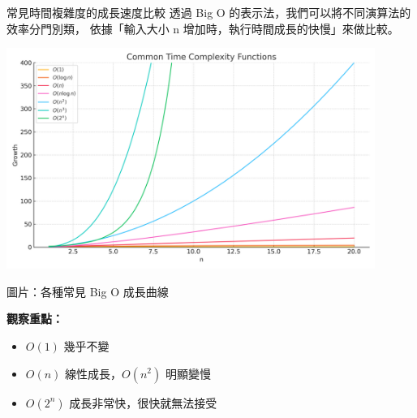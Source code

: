 \documentclass{beamer}
\begin{document}
\begin{frame}{常見時間複雜度的成長速度比較}
透過 Big O 的表示法，我們可以將不同演算法的效率分門別類，  
依據「輸入大小 n 增加時，執行時間成長的快慢」來做比較。

\vspace{1em}
\begin{center}
    \includegraphics[width=0.9\textwidth]{images/time_complexity_curves.png}
    
    {\tiny 圖片：各種常見 Big O 成長曲線}
\end{center}

\vspace{1em}
\textbf{觀察重點：}
\begin{itemize}
    \item $O(1)$ 幾乎不變
    \item $O(n)$ 線性成長，$O(n^2)$ 明顯變慢
    \item $O(2^n)$ 成長非常快，很快就無法接受
\end{itemize}
\end{frame}
\end{document}
